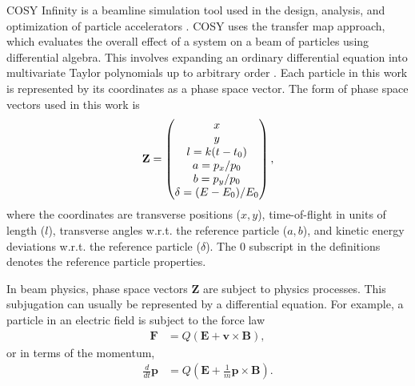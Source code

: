 \label{sec:cosy}\par
COSY Infinity is a beamline simulation tool used in the design, analysis, and optimization of particle accelerators \cite{cosy}. COSY uses the transfer map approach, which evaluates the overall effect of a system on a beam of particles using differential algebra. This involves expanding an ordinary differential equation into multivariate Taylor polynomials up to arbitrary order \cite{modernMapMethods}. Each particle in this work is represented by its coordinates as a phase space vector. The form of phase space vectors used in this work is
\begin{equation}
\centering
\mathbf{Z}=
\begin{pmatrix}
x\\ y\\ l=k(t-t_0)\\a=p_x/p_0\\b=p_y/p_0\\  \delta = (E-E_0)/E_0
\end{pmatrix},
\label{eqn:phaseSpaceVector}
\end{equation}
where the coordinates are transverse positions ($x, y$), time-of-flight in units of length ($l$), transverse angles w.r.t. the reference particle ($a, b$), and kinetic energy deviations w.r.t. the reference particle ($\delta$). The $0$ subscript in the definitions denotes the reference particle properties.

In beam physics, phase space vectors $\mathbf{Z}$ are subject to physics processes. This subjugation can usually be represented by a differential equation. For example, a particle in an electric field is subject to the force law \cite{griffithsem}
\begin{align}\nonumber
\mathbf{F}&=Q(\mathbf{E}+\mathbf{v}\times \mathbf{B}),
\end{align}
or in terms of the momentum,
\begin{align}\nonumber
\frac{d}{dt}\mathbf{p}&=Q(\mathbf{E}+\frac{1}{m}\mathbf{p}\times \mathbf{B}).
\end{align}

